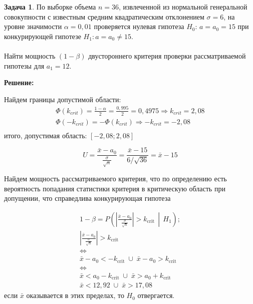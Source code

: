\documentclass[a4paper,11pt]{article}
\newenvironment{shdd}{\begin{mdframed}[backgroundcolor=shadecolor]}{\end{mdframed}}
\theoremstyle{definition}
\newtheorem{problem}{Задача}\setlength{\parindent}{0pt}
\newenvironment{solution}
{\begin{shdd}
     \textbf{Решение:}\par\setlength{\parindent}{0pt}}
     {
\end{shdd}}
\begin{document}
    \newpage
    \begin{problem}
        По выборке объема \(n = 36\), извлеченной из нормальной генеральной совокупности
        с известным средним квадратическим отклонением \(\sigma = 6\), на уровне значимости
        \(\alpha = 0,01\) проверяется нулевая гипотеза \(H_0\):
        \(a = a_0 = 15\) при конкурирующей гипотезе \(H_1 : a = a_0 \neq 15\).
        \\
        \\
        Найти мощность \((1-\beta)\) двустороннего критерия проверки рассматриваемой гипотезы для \(a_1 = 12\).

        \begin{solution}
            Найдем границы допустимой области:
            \begin{gather*}
                \Phi(k_{crit}) = \frac{1 - \alpha}{2} = \frac{0,995}{2} = 0,4975 \Longrightarrow k_{crit} = 2,08\\
                \Phi(-k_{crit}) = -\Phi(k_{crit}) \Longrightarrow -k_{crit} = -2,08\\
            \end{gather*}
            итого, допустимая область: \([-2,08; 2,08]\)

            \[
                U = \frac{\bar{x} - a_0}{\frac{\sigma}{\sqrt {n}}} = \frac{\bar{x} - 15}{6/\sqrt{36}} = \bar{x} - 15
            \]

            Найдем мощность рассматриваемого критерия, что по определению есть вероятность
            попадания статистики критерия в критическую область при допущении, что справедлива
            конкурирующая гипотеза

            \begin{gather*}
                1 - \beta = P\left(\left| \frac{\bar{x} - a_0}{\frac{\sigma}{\sqrt{n}}} \right| > k_{\text{crit}} \,\middle|\, H_1\right); \\
                \left| \frac{\bar{x} - a_0}{\frac{\sigma}{\sqrt{n}}} \right| > k_{\text{crit}} \\
                \Leftrightarrow \\
                \bar{x} - a_0 < -k_{\text{crit}} \;\cup\; \bar{x} - a_0 > k_{\text{crit}} \\
                \Leftrightarrow \\
                \bar{x} < a_0 - k_{\text{crit}} \;\cup\; \bar{x} > a_0 + k_{\text{crit}} \\
                \bar{x} < 12,92 \;\cup\; \bar{x} > 17,08
            \end{gather*}
            если \(\bar{x}\) оказывается в этих пределах, то \(H_0\) отвергается.


\end{solution}
\end{problem}
\end{document}
